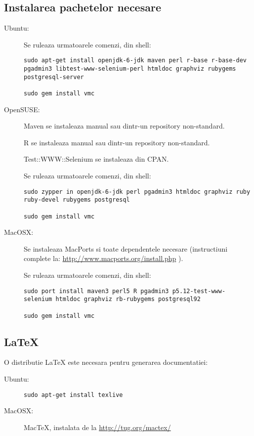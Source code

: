 \subsection{Instalarea pachetelor necesare}
\begin{description}
\item[Ubuntu:]
Se ruleaza urmatoarele comenzi, din shell:
\begin{lstlisting}[breaklines=true]
sudo apt-get install openjdk-6-jdk maven perl r-base r-base-dev pgadmin3 libtest-www-selenium-perl htmldoc graphviz rubygems postgresql-server

sudo gem install vmc
\end{lstlisting}

\item[OpenSUSE:]
Maven se instaleaza manual sau dintr-un repository non-standard.

R se instaleaza manual sau dintr-un repository non-standard.

Test::WWW::Selenium se instaleaza din CPAN.

Se ruleaza urmatoarele comenzi, din shell:
\begin{lstlisting}[breaklines=true]
sudo zypper in openjdk-6-jdk perl pgadmin3 htmldoc graphviz ruby ruby-devel rubygems postgresql

sudo gem install vmc
\end{lstlisting}

\item[MacOSX:]

Se instaleaza MacPorts si toate dependentele necesare (instructiuni complete la:
\url{http://www.macports.org/install.php} ).

Se ruleaza urmatoarele comenzi, din shell:
\begin{lstlisting}[breaklines=true]
sudo port install maven3 perl5 R pgadmin3 p5.12-test-www-selenium htmldoc graphviz rb-rubygems postgresql92
	
sudo gem install vmc
\end{lstlisting}
\end{description}

\subsection{LaTeX}
O distributie LaTeX este necesara pentru generarea documentatiei:

\begin{description}
\item[Ubuntu:] 
\begin{lstlisting}[breaklines=true]
	sudo apt-get install texlive
\end{lstlisting}
\item[MacOSX:] 
MacTeX, instalata de la \url{http://tug.org/mactex/} 
\end{description}

